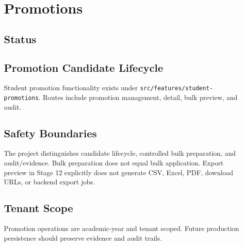 \chapter{Promotions}
\section{Status}
\statusimplemented

\section{Promotion Candidate Lifecycle}
Student promotion functionality exists under \texttt{src/features/student-promotions}. Routes include promotion management, detail, bulk preview, and audit.

\section{Safety Boundaries}
The project distinguishes candidate lifecycle, controlled bulk preparation, and audit/evidence. Bulk preparation does not equal bulk application. Export preview in Stage 12 explicitly does not generate CSV, Excel, PDF, download URLs, or backend export jobs.

\section{Tenant Scope}
Promotion operations are academic-year and tenant scoped. Future production persistence should preserve evidence and audit trails.
